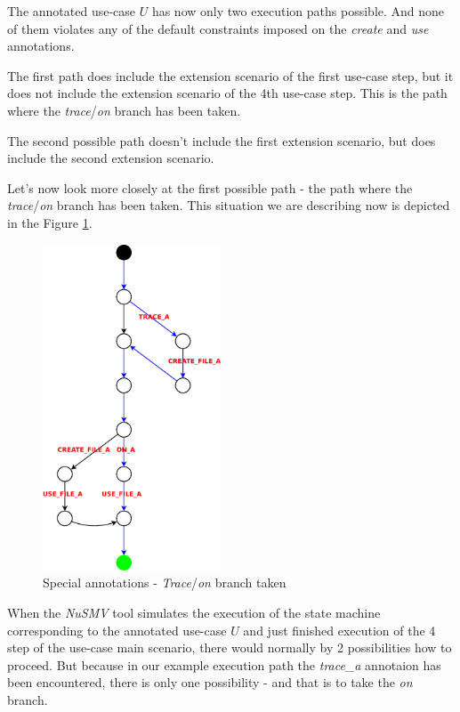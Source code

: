 \newpage

The annotated use-case $U$ has now only two execution paths possible. And none of them violates any of the default constraints
imposed on the \emph{create} and \emph{use} annotations.

The first path does include the extension scenario of the first use-case
step, but it does not include the extension scenario of the 4th use-case step. This is the path where the \emph{trace}/\emph{on} branch
has been taken.

The second possible path doesn't include the first extension scenario, but does include the second extension scenario.


Let's now look more closely at the first possible path - the path where the \emph{trace}/\emph{on} branch has been taken.
This situation we are describing now is depicted in the Figure \ref{fig:traceTestTaken}.

\newpage

\begin{figure}[ht]
  \centering
  \includegraphics[width=150pt]{images/traceTest_path_taken}
  \caption{Special annotations - \emph{Trace}/\emph{on} branch taken}
  \label{fig:traceTestTaken}
\end{figure}
When the \emph{NuSMV} tool simulates the execution of the state machine corresponding to the annotated use-case $U$ and just finished
execution of the 4 step of the use-case main scenario, there would normally by 2 possibilities how to proceed. But because in our
example execution path the \emph{trace\_a} annotaion has been encountered, there is only one possibility - and that is to take the
\emph{on} branch.

